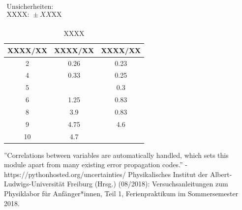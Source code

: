 \documentclass[11pt,a4paper]{article}
\begin{document}
\begin{table}[h]
\centering
\caption{XXXX} \vspace{11pt}
$\begin{array}{l}
\textrm{Unsicherheiten:}\\
\textrm{XXXX: } \pm XX \textrm{XX}\\
\end{array}$
\begin{tabular}{ccc}
\toprule
\textrm{XXXX}/\textrm{XX} & \textrm{XXXX}/\textrm{XX} & \textrm{XXXX}/\textrm{XX} \\
\midrule 
2 & 0.26 & 0.23\\
\hline
4 & 0.33 & 0.25\\
\hline 
5 & & 0.3\\
\hline 
6 & 1.25 & 0.83\\
\hline 
8 & 3.9 & 0.83\\ 
\hline
9 & 4.75 & 4.6\\ 
\hline
10 & 4.7 &\\ 
\bottomrule
\end{tabular}
\label{Tab:X}
\end{table}


\begin{thebibliography}{9}
''Correlations between variables are automatically handled, which sets this module apart from many existing error propagation codes.'' - https://pythonhosted.org/uncertainties/
 Physikalisches Institut der Albert-Ludwigs-Universität Freiburg (Hrsg.) (08/2018): Versuchsanleitungen zum Physiklabor für Anfänger*innen, Teil 1, Ferienpraktikum im Sommersemester 2018.
\end{thebibliography}
\end{document}
